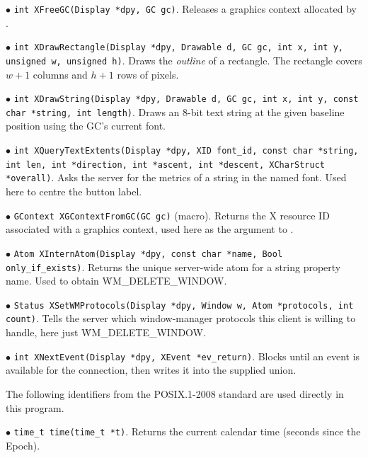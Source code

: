 \item{$\bullet$} {\tt int XFreeGC(Display *dpy, GC gc)}.
Releases a graphics context allocated by .

\item{$\bullet$} {\tt int XDrawRectangle(Display *dpy, Drawable d,
GC gc, int x, int y, unsigned w, unsigned h)}.
Draws the {\it outline\/} of a rectangle.  The rectangle covers
$w+1$ columns and $h+1$ rows of pixels.

\item{$\bullet$} {\tt int XDrawString(Display *dpy, Drawable d,
GC gc, int x, int y, const char *string, int length)}.
Draws an 8-bit text string at the given baseline position using
the GC's current font.

\item{$\bullet$} {\tt int XQueryTextExtents(Display *dpy,
XID font\_id, const char *string, int len,
int *direction, int *ascent, int *descent,
XCharStruct *overall)}.
Asks the server for the metrics of a string in the named font.
Used here to centre the button label.

\item{$\bullet$} {\tt GContext XGContextFromGC(GC gc)} (macro).
Returns the X resource ID associated with a graphics context, used
here as the  argument to .

\item{$\bullet$} {\tt Atom XInternAtom(Display *dpy,
const char *name, Bool only\_if\_exists)}.
Returns the unique server-wide atom for a string property name.
Used to obtain \.{WM\_DELETE\_WINDOW}.

\item{$\bullet$} {\tt Status XSetWMProtocols(Display *dpy, Window w,
Atom *protocols, int count)}.
Tells the server which window-manager protocols this client is
willing to handle, here just \.{WM\_DELETE\_WINDOW}.

\item{$\bullet$} {\tt int XNextEvent(Display *dpy, XEvent *ev\_return)}.
Blocks until an event is available for the connection, then writes
it into the supplied union.

\fi

The following identifiers from the POSIX.1-2008 standard are used
directly in this program.

\medskip
\item{$\bullet$} {\tt time\_t time(time\_t *t)}.
Returns the current calendar time (seconds since the Epoch).


